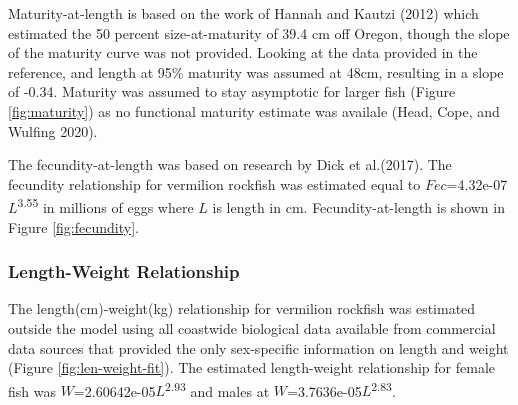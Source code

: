 \documentclass[11pt,
  english,
  a4paper,
]{article}
\begin{document}
\leavevmode\tagmcend\tagstructend


Maturity-at-length is based on the work of Hannah and Kautzi {(2012)\leavevmode\tagmcend\tagstructend} which estimated the 50 percent size-at-maturity of 39.4 cm off Oregon, though the slope of the maturity curve was not provided. Looking at the data provided in the reference, and length at 95\% maturity was assumed at 48cm, resulting in a slope of -0.34. Maturity was assumed to stay asymptotic for larger fish (Figure \ref{fig:maturity}) as no functional maturity estimate was availale {(Head, Cope, and Wulfing 2020)\leavevmode\tagmcend\tagstructend}.

\leavevmode\tagmcend\tagstructend\par


The fecundity-at-length was based on research by Dick et al.{(2017)\leavevmode\tagmcend\tagstructend}. The fecundity relationship for vermilion rockfish was estimated equal to {\(Fec\)\leavevmode\tagmcend\tagstructend}=4.32e-07{\(L\)\leavevmode\tagmcend\tagstructend}\textsuperscript{3.55} in millions of eggs where {\(L\)\leavevmode\tagmcend\tagstructend} is length in cm. Fecundity-at-length is shown in Figure \ref{fig:fecundity}.

\leavevmode\tagmcend\tagstructend\par


\hypertarget{length-weight-relationship}{%
\subsubsection{Length-Weight Relationship}\label{length-weight-relationship}}

\leavevmode\tagmcend\tagstructend


The length(cm)-weight(kg) relationship for vermilion rockfish was estimated outside the model using all coastwide biological data available from commercial data sources that provided the only sex-specific information on length and weight (Figure \ref{fig:len-weight-fit}). The estimated length-weight relationship for female fish was {\(W\)\leavevmode\tagmcend\tagstructend}=2.60642e-05{\(L\)\leavevmode\tagmcend\tagstructend}\textsuperscript{2.93} and males at {\(W\)\leavevmode\tagmcend\tagstructend}=3.7636e-05{\(L\)\leavevmode\tagmcend\tagstructend}\textsuperscript{2.83}.
\end{document}
